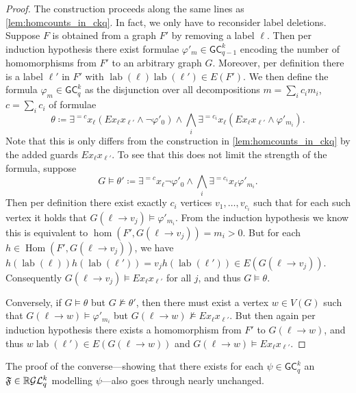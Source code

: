 \documentclass{lmcs}
\theoremstyle{plain}\newtheorem{claim}[thm]{Claim}   %
\newcommand{\RR}{\ensuremath \mathbb{R}}
\newcommand{\cG}{\ensuremath{\mathcal G}}
\newcommand{\cL}{\ensuremath{\mathcal L}}
\DeclareMathOperator{\HOM}{Hom}
\newcommand{\Lkq}{\ensuremath{\cL_{q}^{k}}}
\newcommand{\GEkq}{\ensuremath{\cG\Lkq}}
\newcommand{\lGC}{\ensuremath{\mathsf{GC}}}
\newcommand{\qg}[1]{\ensuremath{\mathfrak{#1}}}
\DeclareMathOperator{\labfkt}{lab}
\begin{document}
\begin{proof}
	The construction proceeds along the same lines as \autoref{lem:homcounts_in_ckq}.
	In fact, we only have to reconsider label deletions.
	Suppose $F$ is obtained from a graph $F'$ by removing a label $\ell$.
	Then per induction hypothesis there exist formulae $\varphi'_m \in \mathsf{GC}_{q-1}^k$ encoding the number of homomorphisms from $F'$ to an arbitrary graph $G$.
	Moreover, per definition there is a label $\ell'$ in $F'$ with $\labfkt(\ell)\labfkt(\ell') \in E(F')$.
	We then define the formula $\varphi_m \in \lGC_{q}^k$ as the disjunction over all decompositions $m = \sum_i c_im_i$, $c = \sum_i c_i$ of formulae
	\begin{equation*}
		\theta \coloneqq \exists^{=c}x_\ell (Ex_{\ell}x_{\ell'} \land \neg \varphi'_0) \land \bigwedge_i \exists^{=c_i}x_\ell(Ex_{\ell}x_{\ell'} \land \varphi'_{m_i}).
	\end{equation*}
	Note that this is only differs from the construction in \autoref{lem:homcounts_in_ckq} by the added guards $Ex_{\ell}x_{\ell'}$.
	To see that this does not limit the strength of the formula, suppose
	\begin{equation*}
		G \models \theta' \coloneqq \exists^{=c}x_\ell \neg \varphi'_0 \land \bigwedge_i \exists^{=c_i}x_\ell\varphi'_{m_i}.
	\end{equation*}
	Then per definition there exist exactly $c_i$ vertices $v_1, \dots, v_{c_i}$ such that for each such vertex it holds that $G(\ell \to v_j) \models \varphi'_{m_i}$.
	From the induction hypothesis we know this is equivalent to $\hom(F', G(\ell \to v_j)) = m_i > 0$.
	But for each $h \in \HOM(F', G(\ell \to v_j))$, we have $h(\labfkt(\ell))h(\labfkt(\ell')) = v_jh(\labfkt(\ell')) \in E(G(\ell \to v_j))$.
	Consequently $G(\ell \to v_j) \models Ex_{\ell}x_{\ell'}$ for all $j$, and thus $G \models \theta$.
	
	Conversely, if $G \models \theta$ but $G \not\models \theta'$, then there must exist a vertex $w\in V(G)$ such that $G(\ell \to w) \models \varphi'_{m_i}$ but $G(\ell \to w) \not\models Ex_{\ell}x_{\ell'}$.
	But then again per induction hypothesis there exists a homomorphism from $F'$ to $G(\ell \to w)$, and thus $w\labfkt(\ell') \in E(G(\ell \to w))$ and $G(\ell \to w) \models Ex_{\ell}x_{\ell'}$.
\end{proof}

The proof of the converse---showing that there exists for each $\psi \in \lGC^k_q$ an $\qg{F} \in \RR\GEkq$ modelling $\psi$---also goes through nearly unchanged.
\end{document}
